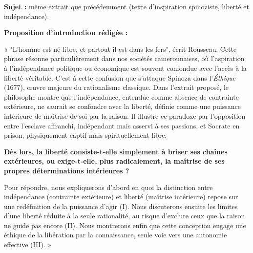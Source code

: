 \documentclass[11pt]{article}
\begin{document}
\begin{exoresolu}
\textbf{Sujet :} même extrait que précédemment (texte d'inspiration spinoziste, liberté et indépendance).

\tcblower
\textbf{Proposition d'introduction rédigée :}

« "L'homme est né libre, et partout il est dans les fers", écrit Rousseau. Cette phrase résonne particulièrement dans nos sociétés camerounaises, où l'aspiration à l'indépendance politique ou économique est souvent confondue avec l'accès à la liberté véritable. C'est à cette confusion que s'attaque Spinoza dans l'\emph{Éthique} (1677), œuvre majeure du rationalisme classique. Dans l'extrait proposé, le philosophe montre que l'indépendance, entendue comme absence de contrainte extérieure, ne saurait se confondre avec la liberté, définie comme une puissance intérieure de maîtrise de soi par la raison. Il illustre ce paradoxe par l'opposition entre l'esclave affranchi, indépendant mais asservi à ses passions, et Socrate en prison, physiquement captif mais spirituellement libre.

\textbf{Dès lors, la liberté consiste-t-elle simplement à briser ses chaînes extérieures, ou exige-t-elle, plus radicalement, la maîtrise de ses propres déterminations intérieures ?}

Pour répondre, nous expliquerons d'abord en quoi la distinction entre indépendance (contrainte extérieure) et liberté (maîtrise intérieure) repose sur une redéfinition de la puissance d'agir (I). Nous discuterons ensuite les limites d'une liberté réduite à la seule rationalité, au risque d'exclure ceux que la raison ne guide pas encore (II). Nous montrerons enfin que cette conception engage une éthique de la libération par la connaissance, seule voie vers une autonomie effective (III). »
\end{exoresolu}
\end{document}
